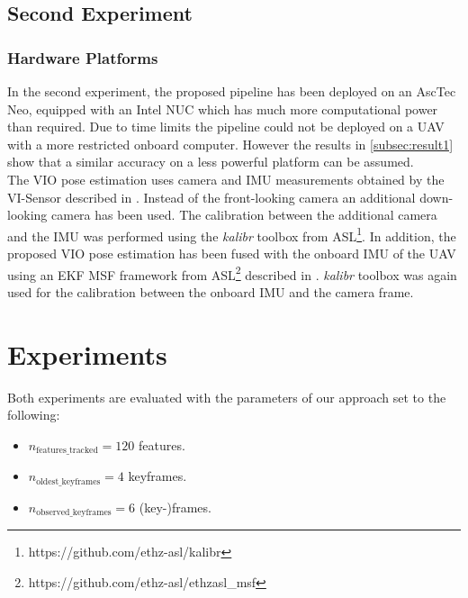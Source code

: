 \subsection{Second Experiment}\label{subsec:secondexperiment}
\subsubsection{Hardware Platforms} \label{subsubsec:hardwareplatforms2}

In the second experiment, the proposed pipeline has been deployed on an
 AscTec Neo, equipped with an Intel NUC which has much more computational power 
than required. Due to time limits the pipeline could not be deployed on 
a \ac{UAV} with a more restricted onboard computer. However the results in 
\autoref{subsec:result1} show that a 
similar accuracy on a less powerful platform can be assumed. \\

The \ac{VIO} pose estimation uses camera and \ac{IMU} measurements obtained 
by the VI-Sensor described in \citep{nikolic2014synchronized}. Instead of the 
front-looking camera an additional down-looking camera has been used. The 
calibration between the additional camera and the \ac{IMU} was performed using 
the \textit{kalibr} toolbox \cite{furgale2013kalibr} from 
\ac{ASL}\footnote{ https://github.com/ethz-asl/kalibr}. In 
addition, the proposed \ac{VIO} pose estimation has been fused with the onboard 
\ac{IMU} of the \ac{UAV} using an \ac{EKF} \ac{MSF} framework from 
\ac{ASL}\footnote{ https://github.com/ethz-asl/ethzasl\_msf} described in 
\citep{lynen2013robust}. \textit{kalibr} toolbox was 
again used for the calibration between the onboard \ac{IMU} and the camera 
frame. \\

\section{Experiments}\label{sec:experiments}
Both experiments are evaluated with the parameters of our approach set to 
the following:
\begin{itemize}
  \item $n_{\text{features\_tracked}} = 120$ features.
  \item $n_{\text{oldest\_keyframes}} = 4$ keyframes.
  \item $n_{\text{observed\_keyframes}} = 6$ (key-)frames. 
\end{itemize}


